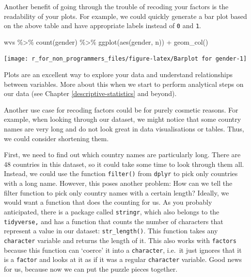 \documentclass[
]{book}
\newenvironment{Shaded}{\begin{snugshade}}{\end{snugshade}}
\newcommand{\FunctionTok}[1]{\textcolor[rgb]{0.00,0.00,0.00}{#1}}
\newcommand{\NormalTok}[1]{#1}
\newcommand{\SpecialCharTok}[1]{\textcolor[rgb]{0.00,0.00,0.00}{#1}}
\begin{document}
Another benefit of going through the trouble of recoding your factors is the readability of your plots. For example, we could quickly generate a bar plot based on the above table and have appropriate labels instead of \texttt{0} and \texttt{1}.

\begin{Shaded}
\begin{Highlighting}[]
\NormalTok{wvs }\SpecialCharTok{\%\textgreater{}\%} \FunctionTok{count}\NormalTok{(gender) }\SpecialCharTok{\%\textgreater{}\%} 
  \FunctionTok{ggplot}\NormalTok{(}\FunctionTok{aes}\NormalTok{(gender, n)) }\SpecialCharTok{+} 
  \FunctionTok{geom\_col}\NormalTok{()}
\end{Highlighting}
\end{Shaded}

\begin{center}\texttt{[image: r\_for\_non\_programmers\_files/figure-latex/Barplot for gender-1]} \end{center}

Plots are an excellent way to explore your data and understand relationships between variables. More about this when we start to perform analytical steps on our data (see Chapter \ref{descriptive-statistics} and beyond).

Another use case for recoding factors could be for purely cosmetic reasons. For example, when looking through our dataset, we might notice that some country names are very long and do not look great in data visualisations or tables. Thus, we could consider shortening them.

First, we need to find out which country names are particularly long. There are 48 countries in this dataset, so it could take some time to look through them all. Instead, we could use the function \texttt{filter()} from \texttt{dplyr} to pick only countries with a long name. However, this poses another problem: How can we tell the filter function to pick only country names with a certain length? Ideally, we would want a function that does the counting for us. As you probably anticipated, there is a package called \texttt{stringr}, which also belongs to the \texttt{tidyverse,} and has a function that counts the number of characters that represent a value in our dataset: \texttt{str\_length()}. This function takes any \texttt{character} variable and returns the length of it. This also works with \texttt{factors} because this function can `coerce' it into a \texttt{character}, i.e.~it just ignores that it is a \texttt{factor} and looks at it as if it was a regular \texttt{character} variable. Good news for us, because now we can put the puzzle pieces together.
\end{document}

